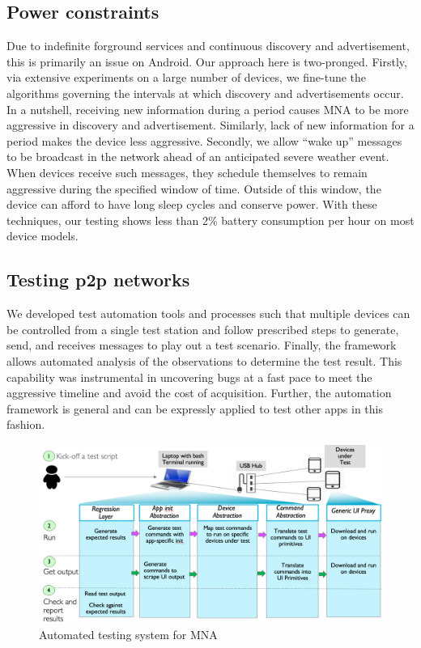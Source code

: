 \documentclass[conference]{IEEEtran}
\begin{document}
\subsection{Power constraints}
\label{sec:power}
%
Due to indefinite forground services and continuous discovery and
advertisement, this is primarily an issue on Android. Our approach
here is two-pronged. Firstly, via extensive experiments on a large
number of devices, we fine-tune the algorithms governing the intervals
at which discovery and advertisements occur. In a nutshell, receiving
new information during a period causes MNA to be more aggressive in
discovery and advertisement. Similarly, lack of new information for a
period makes the device less aggressive. Secondly, we allow ``wake
up'' messages to be broadcast in the network ahead of an anticipated
severe weather event. When devices receive such messages, they
schedule themselves to remain aggressive during the specified window
of time. Outside of this window, the device can afford to have long
sleep cycles and conserve power. With these techniques, our testing
shows less than 2\% battery consumption per hour on most device
models.
%
\subsection{Testing p2p networks}
\label{sec:texting}
%
We developed test automation tools and processes such that multiple
devices can be controlled from a single test station and follow
prescribed steps to generate, send, and receives messages to play out
a test scenario. Finally, the framework allows automated analysis of
the observations to determine the test result. This capability was
instrumental in uncovering bugs at a fast pace to meet the aggressive
timeline and avoid the cost of acquisition. Further, the automation
framework is general and can be expressly applied to test other apps
in this fashion.

\begin{figure}[htbp]
\centerline{\includegraphics[width=\columnwidth]{figs/test_arch}}
\caption{Automated testing system for MNA}
\label{fig:test_arch}
\end{figure}
\end{document}

